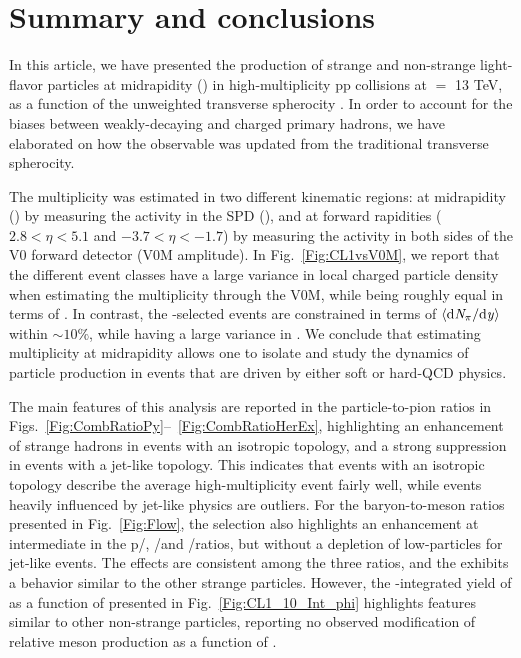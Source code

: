 \section{Summary and conclusions}\label{Sec:Conc}

In this article, we have presented the production of strange and non-strange light-flavor particles at midrapidity () in high-multiplicity pp collisions at \s $=$ 13 TeV, as a function of the unweighted transverse spherocity \SOPT. In order to account for the biases between weakly-decaying and charged primary hadrons, we have elaborated on how the observable was updated from the traditional transverse spherocity.

The multiplicity was estimated in two different kinematic regions: at midrapidity () by  measuring the activity in the SPD (\tracklet), and at forward rapidities ($2.8 < \eta < 5.1$ and $-3.7 < \eta < -1.7$) by measuring the activity in both sides of the V0 forward detector (V0M amplitude). In Fig.~\ref{Fig:CL1vsV0M}, we report that the different \SOPT  event classes have a large variance in local charged particle density when estimating the multiplicity through the V0M, while being roughly equal in terms of \mpt. In contrast, the \tracklet-selected \SOPT events are constrained in terms of $\langle \rm{d}\it{N}_{\pi}/\rm{d}\it{y} \rangle$ within $\sim 10\%$, while having a large variance in \mpt. We conclude that estimating multiplicity at midrapidity allows one to isolate and study the dynamics of particle production in events that are driven by either soft or hard-QCD physics.

The main features of this analysis are reported in the particle-to-pion ratios in Figs.~\ref{Fig:CombRatioPy}--~\ref{Fig:CombRatioHerEx}, highlighting an enhancement of strange hadrons in events with an isotropic topology, and a strong suppression in events with a jet-like topology. This indicates that events with an isotropic topology describe the average high-multiplicity event fairly well, while events heavily influenced by jet-like physics are outliers. For the baryon-to-meson ratios presented in Fig.~\ref{Fig:Flow}, the \SOPT selection also highlights an enhancement at intermediate \pt in the p/\PI, \LA/\kzero and \XI/\PHI ratios, but without a depletion of low-\pt particles for jet-like events. The effects are consistent among the three ratios, and the \PHI exhibits a behavior similar to the other strange particles. However, the \pt-integrated yield of \PHI as a function of \SOPT presented in Fig.~\ref{Fig:CL1_10_Int_phi} highlights features similar to other non-strange particles, reporting no observed modification of relative \PHI meson production as a function of \SOPT.

